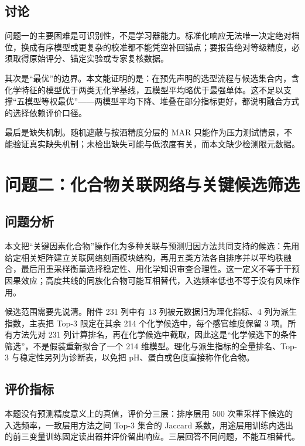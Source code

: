\documentclass[UTF8,a4paper,zihao=-4]{ctexart}
\numberwithin{figure}{section}
\numberwithin{table}{section}
\numberwithin{equation}{section}
\begin{document}
\subsection{讨论}

问题一的主要困难是可识别性，不是学习器能力。标准化响应无法唯一决定绝对档位，换成有序模型或更复杂的校准都不能凭空补回锚点；要报告绝对等级精度，必须取得原始评分、锚定实验或专家复核数据。

其次是“最优”的边界。本文能证明的是：在预先声明的选型流程与候选集合内，含化学特征的模型优于两类无化学基线，五模型平均略优于最强单体。这不足以支撑“五模型等权最优”——两模型平均下降、堆叠在部分指标更好，都说明融合方式的选择依赖评价口径。

最后是缺失机制。随机遮蔽与按酒精度分层的 MAR 只能作为压力测试情景，不能验证真实缺失机制；未检出缺失可能与低浓度有关，而本文缺少检测限元数据。

\section{问题二：化合物关联网络与关键候选筛选}
\label{sec:q2}

\subsection{问题分析}

本文把“关键因素化合物”操作化为多种关联与预测归因方法共同支持的候选：先用给定相关矩阵建立关联网络刻画模块结构，再用五类方法各自排序并以平均秩融合，最后用重采样\cite{efron1979}衡量选择稳定性、用化学知识审查合理性。这一定义不等于干预因果效应；高度共线的同族化合物可能互相替代，入选频率低也不等于没有风味作用。

候选范围需要先说清。附件 231 列中有 13 列被元数据归为理化指标、4 列为派生指数，主表把 Top-3 限定在其余 214 个化学候选中，每个感官维度保留 3 项。所有方法先对 231 列计算排名，再在化学候选中截取，因此这是“化学候选下的条件筛选”，不是假装重新拟合了一个 214 维模型。理化与派生指标的全量排名、Top-3 与稳定性另列为诊断表，以免把 pH、蛋白或色度直接称作化合物。

\subsection{评价指标}

本题没有预测精度意义上的真值，评价分三层：排序层用 500 次重采样下候选的入选频率，一致层用方法之间 Top-3 集合的 Jaccard 系数，用途层用训练内选出的前三变量训练固定读出器并评价留出响应。三层回答不同问题，不能互相替代。
\end{document}
